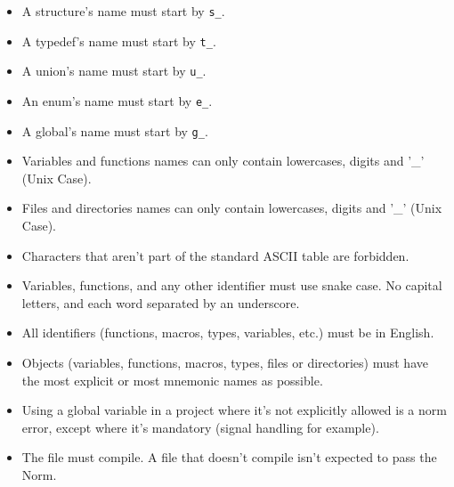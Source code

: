 \documentclass{42-en}
\begin{document}
        \begin{itemize}

            \item A structure's name must start by
                \texttt{s\_}.

            \item A typedef's name must start by
                \texttt{t\_}.

            \item A union's name must start by \texttt{u\_}.

            \item An enum's name must start by \texttt{e\_}.

            \item A global's name must start by \texttt{g\_}.

            \item Variables and functions names can only contain lowercases, digits and
                '\_' (Unix Case).

            \item Files and directories names can only contain lowercases, digits and
                '\_' (Unix Case).

            \item Characters that aren't part of the standard
                ASCII table are forbidden.

            \item Variables, functions, and any other identifier must use
                snake case. No capital letters, and each word separated by an 
                underscore.

            \item All identifiers (functions, macros, types,
                variables, etc.) must be in English.

            \item Objects (variables, functions, macros, types,
                files or directories) must have the most
                explicit or most mnemonic names as possible.

            \item Using a global variable in a project where it's not
                explicitly allowed is a norm error, except where it's
                mandatory (signal handling for example).

            \item The file must compile. A file that doesn't compile isn't expected
                to pass the Norm.
        \end{itemize}
\newpage
\end{document}
